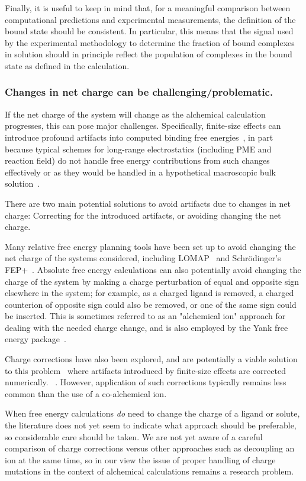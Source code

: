\documentclass[9pt,bestpractices]{livecoms}
\begin{document}
Finally, it is useful to keep in mind that, for a meaningful comparison between computational predictions and experimental measurements, the definition of the bound state should be consistent.
In particular, this means that the signal used by the experimental methodology to determine the fraction of bound complexes in solution should in principle reflect the population of complexes in the bound state as defined in the calculation.

\subsubsection{Changes in net charge can be challenging/problematic.}

If the net charge of the system will change as the alchemical calculation progresses, this can pose major challenges.
Specifically, finite-size effects can introduce profound artifacts into computed binding free energies~\cite{}, in part because typical schemes for long-range electrostatics (including PME and reaction field) do not handle free energy contributions from such changes effectively or as they would be handled in a hypothetical macroscopic bulk solution~\cite{}.

There are two main potential solutions to avoid artifacts due to changes in net charge: Correcting for the introduced artifacts, or avoiding changing the net charge.

Many relative free energy planning tools have been set up to avoid changing the net charge of the systems considered, including LOMAP~\cite{} and Schr\"{o}dinger's FEP+~\cite{chen2018accurate}. Absolute free energy calculations can also potentially avoid changing the charge of the system by making a charge perturbation of equal and opposite sign elsewhere in the system; for example, as a charged ligand is removed, a charged counterion of opposite sign could also be removed, or one of the same sign could be inserted. This is sometimes referred to as an "alchemical ion" approach for dealing with the needed charge change, and is also employed by the Yank free energy package~\cite{wang2013identifying}.

Charge corrections have also been explored, and are potentially a viable solution to this problem~\cite{} where artifacts introduced by finite-size effects are corrected numerically.
~\cite{chen2018accurate}. However, application of such corrections typically remains less common than the use of a co-alchemical ion.

When free energy calculations \emph{do} need to change the charge of a ligand or solute, the literature does not yet seem to indicate what approach should be preferable, so considerable care should be taken.
We are not yet aware of a careful comparison of charge corrections versus other approaches such as decoupling an ion at the same time, so in our view the issue of proper handling of charge mutations in the context of alchemical calculations remains a research problem.
\end{document}
